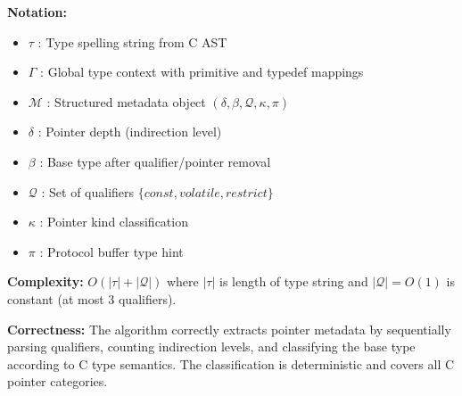 \vspace{0.5cm}

\textbf{Notation:}
\begin{itemize}
    \item $\tau$ : Type spelling string from C AST
    \item $\Gamma$ : Global type context with primitive and typedef mappings
    \item $\mathcal{M}$ : Structured metadata object $(\delta, \beta, \mathcal{Q}, \kappa, \pi)$
    \item $\delta$ : Pointer depth (indirection level)
    \item $\beta$ : Base type after qualifier/pointer removal
    \item $\mathcal{Q}$ : Set of qualifiers $\{const, volatile, restrict\}$
    \item $\kappa$ : Pointer kind classification
    \item $\pi$ : Protocol buffer type hint
\end{itemize}

\textbf{Complexity:} $O(|\tau| + |\mathcal{Q}|)$ where $|\tau|$ is length of type string and $|\mathcal{Q}| = O(1)$ is constant (at most 3 qualifiers).

\textbf{Correctness:} The algorithm correctly extracts pointer metadata by sequentially parsing qualifiers, counting indirection levels, and classifying the base type according to C type semantics. The classification is deterministic and covers all C pointer categories.
